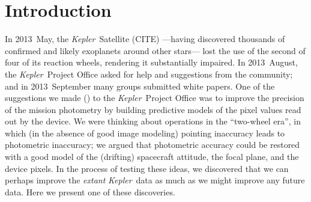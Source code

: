 \documentclass[letterpaper,12pt,preprint]{aastex}
\newcommand{\observatory}[1]{\textsl{#1}}
\newcommand{\Kepler}{\observatory{Kepler}}
\begin{document}
\begin{abstract}
There are many tiny features in \Kepler\ light-curves
  that are thought to be caused by small changes
  in spacecraft pointing, orientation, and temperature.
These features are small,
  but much larger than the transit signals of greatest interest;
  they also mask or confuse intrinsic stellar variability signals.
Because they are spacecraft-induced, the features can be seen repeated
  across many pixels across the focal plane,
  albeit with different amplitudes and signs.
Inspired by ideas from causal inference,
  we learn a model
  in which the brightness recorded at time $t$ from any target pixel $j$
  is predicted using a weighted linear combination of many other pixel recordings
  spatially separated from $j$ (so they don't overlap the same star)
  and in a finite time window around $t$.
We use a train-and-test framework to avoid over-fitting.
The model produces photometric light-curves ``cleaned''
  of spacecraft-induced variability,
  ideal for studying stellar variability or searching for exoplanet transits.
We learn also a second model that uses,
  in addition to spatially separated pixel recordings,
  nearby and cospatial pixel recordings,
  but separated by time lags longer than expected transit signals.
These latter models remove stellar variability signals
  along with spacecraft-induced signals;
  they are even better for pure exoplanet searching.
We demonstrate the methods on a few different \Kepler\ targets
  and release open-source code.
\end{abstract}

\section{Introduction}

In 2013~May,
  the \Kepler\ Satellite (CITE)%
  ---having discovered thousands of confirmed and likely exoplanets around other stars---%
  lost the use of the second of four of its reaction wheels,
  rendering it substantially impaired.
In 2013~August,
  the \Kepler\ Project Office asked for help and suggestions from the community; and
  in 2013~September many groups submitted white papers.
One of the suggestions we made (\citealt{whitepaper}) to the \Kepler\ Project Office
  was to improve the precision of the mission photometry
  by building predictive models of the pixel values read out by the device.
We were thinking about operations in the ``two-wheel era'',
  in which (in the absence of good image modeling)
  pointing inaccuracy leads to photometric inaccuracy;
  we argued that photometric accuracy could be restored with a good model
  of the (drifting) spacecraft attitude, the focal plane, and the device pixels.
In the process of testing these ideas,
  we discovered that we can perhaps improve the \emph{extant} \Kepler\ data
  as much as we might improve any future data.
Here we present one of these discoveries.
\end{document}
